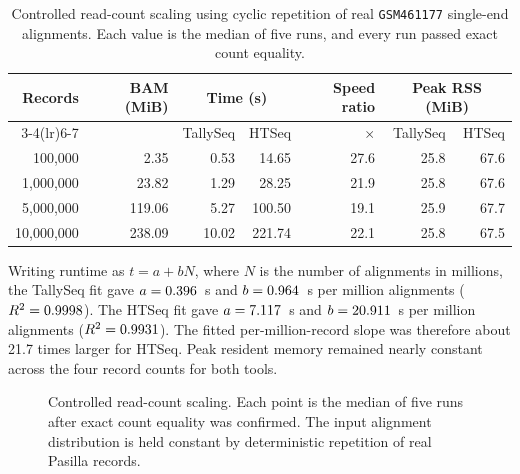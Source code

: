 \documentclass[11pt]{article}
\begin{document}
\begin{table}[ht]
\centering
\caption{Controlled read-count scaling using cyclic repetition of real \texttt{GSM461177} single-end alignments. Each value is the median of five runs, and every run passed exact count equality.}
\label{tab:scaling}
\begin{tabular}{rrrrrrr}
\toprule
Records & BAM (MiB) & \multicolumn{2}{c}{Time (s)} & Speed ratio & \multicolumn{2}{c}{Peak RSS (MiB)} \\
\cmidrule(lr){3-4}\cmidrule(lr){6-7}
 & & TallySeq & HTSeq & $\times$ & TallySeq & HTSeq \\
\midrule
100,000 & 2.35 & 0.53 & 14.65 & 27.6 & 25.8 & 67.6 \\
1,000,000 & 23.82 & 1.29 & 28.25 & 21.9 & 25.8 & 67.6 \\
5,000,000 & 119.06 & 5.27 & 100.50 & 19.1 & 25.9 & 67.7 \\
10,000,000 & 238.09 & 10.02 & 221.74 & 22.1 & 25.8 & 67.5 \\
\bottomrule
\end{tabular}
\end{table}

Writing runtime as $t = a + bN$, where $N$ is the number of alignments in millions, the TallySeq fit gave $a=0.396{}$~s and $b=0.964{}$~s per million alignments ($R^2=0.9998$). The HTSeq fit gave $a=7.117{}$~s and $b=20.911{}$~s per million alignments ($R^2=0.9931$). The fitted per-million-record slope was therefore about 21.7 times larger for HTSeq. Peak resident memory remained nearly constant across the four record counts for both tools.

\begin{figure}[ht]
\centering
{}
\caption{Controlled read-count scaling. Each point is the median of five runs after exact count equality was confirmed. The input alignment distribution is held constant by deterministic repetition of real Pasilla records.}
\label{fig:scaling}
\end{figure}
\end{document}
